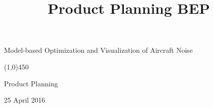 \documentclass[a4paper,english,fleqn]{exam}
\title{Product Planning BEP}
\newcommand{\cMysename}{Model-based Optimization and Visualization of Aircraft Noise}
\newcommand{\doctitle}{Product Planning }
\newcommand{\deadline}{25 April 2016}
\newcommand{\examdate}{\deadline}
\begin{document}
\thispagestyle{empty}

\begin{center}

\vspace*{2cm}
{\huge \cMysename}

\begin{center}
    \line(1,0){450}
\end{center}

{\LARGE \doctitle}

\vspace{1cm}

{\Large \examdate}

\end{center}
\newpage

\tableofcontents
\newpage





\end{document}
